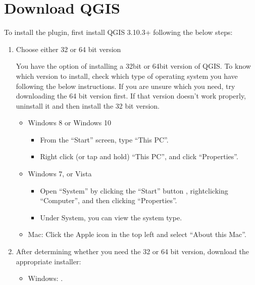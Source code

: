\documentclass[letterpaper,10pt,english]{sphinxmanual}
\begin{document}
\section{Download QGIS}
\label{\detokenize{Qgis_Plugin/before_installing:download-qgis}}
\sphinxAtStartPar
To install the plugin, first install QGIS 3.10.3+ following the below steps:
\begin{enumerate}
%
\item {} 
\sphinxAtStartPar
Choose either 32 or 64 bit version

\sphinxAtStartPar
You have the option of installing a 32\sphinxhyphen{}bit or 64\sphinxhyphen{}bit version of QGIS. To
know which version to install, check which type of operating system you have
following the below instructions. If you are unsure which you need, try
downloading the 64 bit version first. If that version doesn’t work properly,
un\sphinxhyphen{}install it and then install the 32 bit version.
\begin{itemize}
\item {} 
\sphinxAtStartPar
Windows 8 or Windows 10
\begin{itemize}
\item {} 
\sphinxAtStartPar
From the “Start” screen, type “This PC”.

\item {} 
\sphinxAtStartPar
Right click (or tap and hold) “This PC”, and click “Properties”.

\end{itemize}

\item {} 
\sphinxAtStartPar
Windows 7, or Vista
\begin{itemize}
\item {} 
\sphinxAtStartPar
Open “System” by clicking the “Start” button , right\sphinxhyphen{}clicking
“Computer”, and then clicking “Properties”.

\item {} 
\sphinxAtStartPar
Under System, you can view the system type.

\end{itemize}

\item {} 
\sphinxAtStartPar
Mac: Click the Apple icon in the top left and select “About this Mac”.

\end{itemize}

\item {} 
\sphinxAtStartPar
After determining whether you need the 32 or 64 bit version, download the
appropriate installer:
\begin{itemize}
\item {} 
\sphinxAtStartPar
Windows: .


\end{itemize}
\end{enumerate}
\end{document}
